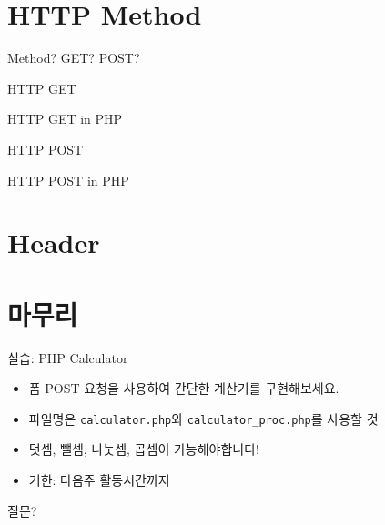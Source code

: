 \documentclass{beamer}
\begin{document}
\section{HTTP Method}

    \begin{frame}{Method? GET? POST?}

    \end{frame}

    \begin{frame}{HTTP GET}

    \end{frame}

    \begin{frame}{HTTP GET in PHP}

    \end{frame}

    \begin{frame}{HTTP POST}

    \end{frame}

    \begin{frame}{HTTP POST in PHP}

    \end{frame}

\section{Header}

\section{마무리}
    \begin{frame}{실습: PHP Calculator}
        \begin{itemize}
            \item 폼 POST 요청을 사용하여 간단한 계산기를 구현해보세요.
            \item 파일명은 \texttt{calculator.php}와 \texttt{calculator_proc.php}를 사용할 것
            \item 덧셈, 뺄셈, 나눗셈, 곱셈이 가능해야합니다!
            \item 기한: 다음주 활동시간까지
        \end{itemize}
    \end{frame}


    \begin{frame}{질문?}

    \end{frame}
\end{document}

